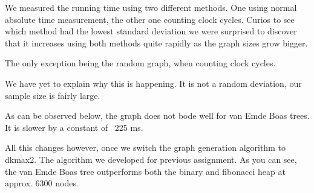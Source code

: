 We measured the running time using two different methods. One using normal absolute time measurement, the other one counting clock cycles. Curios to see which method had the lowest standard deviation we were surprised to discover that it increases using both methods quite rapidly as the graph sizes grow bigger.



The only exception being the random graph, when counting clock cycles.



We have yet to explain why this is happening. It is not a random deviation, our sample size is fairly large.



As can be observed below, the graph does not bode well for van Emde Boas trees. It is slower by a constant of ~225 ms.



All this changes however, once we switch the graph generation algorithm to dkmax2. The algorithm we developed for previous assignment. As you can see, the van Emde Boas tree outperforms both the binary and fibonacci heap at approx. 6300 nodes.


